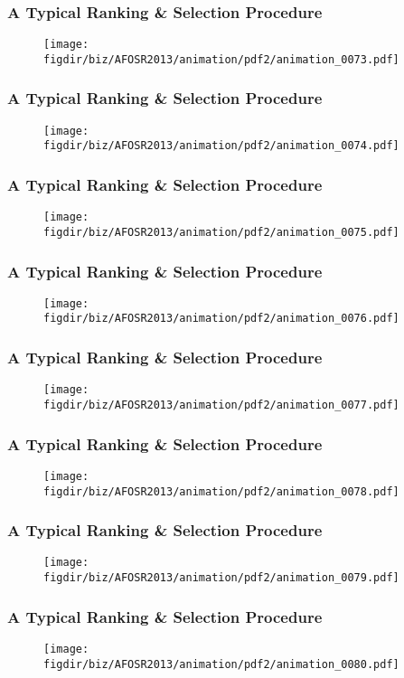 \documentclass[13pt]{beamer}
\newcommand{\figdir}{../../fig}
\begin{document}
{\begin{frame}\frametitle{A Typical Ranking \& Selection Procedure}\begin{figure}\texttt{[image: \\figdir/biz/AFOSR2013/animation/pdf2/animation\_0073.pdf]}\end{figure}\end{frame}
\begin{frame}\frametitle{A Typical Ranking \& Selection Procedure}\begin{figure}\texttt{[image: \\figdir/biz/AFOSR2013/animation/pdf2/animation\_0074.pdf]}\end{figure}\end{frame}
\begin{frame}\frametitle{A Typical Ranking \& Selection Procedure}\begin{figure}\texttt{[image: \\figdir/biz/AFOSR2013/animation/pdf2/animation\_0075.pdf]}\end{figure}\end{frame}
\begin{frame}\frametitle{A Typical Ranking \& Selection Procedure}\begin{figure}\texttt{[image: \\figdir/biz/AFOSR2013/animation/pdf2/animation\_0076.pdf]}\end{figure}\end{frame}
\begin{frame}\frametitle{A Typical Ranking \& Selection Procedure}\begin{figure}\texttt{[image: \\figdir/biz/AFOSR2013/animation/pdf2/animation\_0077.pdf]}\end{figure}\end{frame}
\begin{frame}\frametitle{A Typical Ranking \& Selection Procedure}\begin{figure}\texttt{[image: \\figdir/biz/AFOSR2013/animation/pdf2/animation\_0078.pdf]}\end{figure}\end{frame}
\begin{frame}\frametitle{A Typical Ranking \& Selection Procedure}\begin{figure}\texttt{[image: \\figdir/biz/AFOSR2013/animation/pdf2/animation\_0079.pdf]}\end{figure}\end{frame}
\begin{frame}\frametitle{A Typical Ranking \& Selection Procedure}\begin{figure}\texttt{[image: \\figdir/biz/AFOSR2013/animation/pdf2/animation\_0080.pdf]}\end{figure}\end{frame}
}
\end{document}
